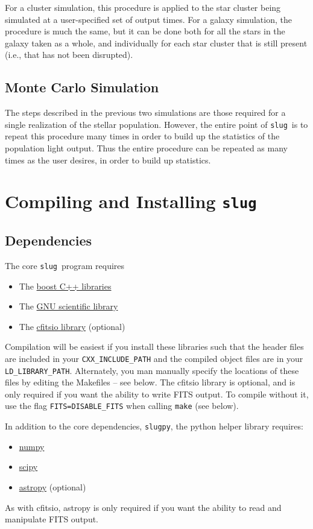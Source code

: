 \documentclass[12pt]{article}
\newcommand{\slug}{\texttt{slug}}
\newcommand{\slugpy}{\texttt{slugpy}}
\begin{document}
For a cluster simulation, this procedure is applied to the star cluster being simulated at a user-specified set of output times. For a galaxy simulation, the procedure is much the same, but it can be done both for all the stars in the galaxy taken as a whole, and individually for each star cluster that is still present (i.e., that has not been disrupted).

\subsection{Monte Carlo Simulation}

The steps described in the previous two simulations are those required for a single realization of the stellar population. However, the entire point of \slug\ is to repeat this procedure many times in order to build up the statistics of the population light output. Thus the entire procedure can be repeated as many times as the user desires, in order to build up statistics.

\section{Compiling and Installing \slug}

\subsection{Dependencies}

The core \slug\ program requires
\begin{itemize}
\item The \href{http://www.boost.org/}{boost C++ libraries}
\item The \href{http://www.gnu.org/software/gsl/}{GNU scientific library}
\item The \href{http://heasarc.gsfc.nasa.gov/fitsio/fitsio.html}{cfitsio library} (optional)
\end{itemize}
Compilation will be easiest if you install these libraries such that the header files are included in your \verb=CXX_INCLUDE_PATH= and the compiled object files are in your \verb=LD_LIBRARY_PATH=. Alternately, you man manually specify the locations of these files by editing the Makefiles -- see below. The cfitsio library is optional, and is only required if you want the ability to write FITS output. To compile without it, use the flag \verb!FITS=DISABLE_FITS! when calling \verb=make= (see below).

In addition to the core dependencies, \slugpy, the python helper library requires:
\begin{itemize}
\item \href{http://www.numpy.org/}{numpy}
\item \href{http://www.scipy.org/}{scipy}
\item \href{http://www.astropy.org/}{astropy} (optional)
\end{itemize}
As with cfitsio, astropy is only required if you want the ability to read and manipulate FITS output. 
\end{document}
